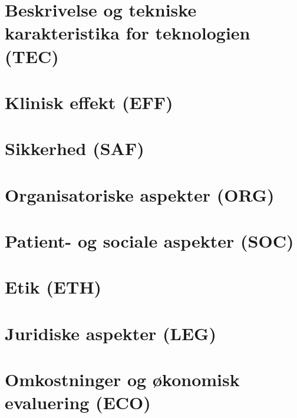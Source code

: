 \chapter{Beskrivelse og tekniske karakteristika for teknologien (TEC)}\vspace{-.75cm} \label{TEC_chap}


\chapter{Klinisk effekt (EFF)}\vspace{-.75cm} \label{EFF_chap}


\chapter{Sikkerhed (SAF)}\vspace{-.75cm} \label{SAF_chap}


\chapter{Organisatoriske aspekter (ORG)}\vspace{-.75cm} \label{ORG_chap}


\chapter{Patient- og sociale aspekter (SOC)}\vspace{-.75cm} \label{SOC_chap}


\chapter{Etik (ETH)}\vspace{-.75cm} \label{ETH_chap}


\chapter{Juridiske aspekter (LEG)}\vspace{-.75cm} \label{LEG_chap}


\chapter{Omkostninger og økonomisk evaluering (ECO)}\vspace{-.75cm} \label{ECO_chap}


